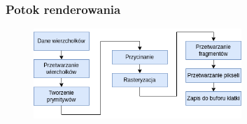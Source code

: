 \documentclass[aspectratio=169]{beamer}
\begin{document}
\begin{frame}
\frametitle{Potok renderowania}
		\begin{figure}
			\centering
			\includegraphics[width=0.7\textwidth]{graphics_pipeline.png}
		\end{figure}
\end{frame}
\end{document}

